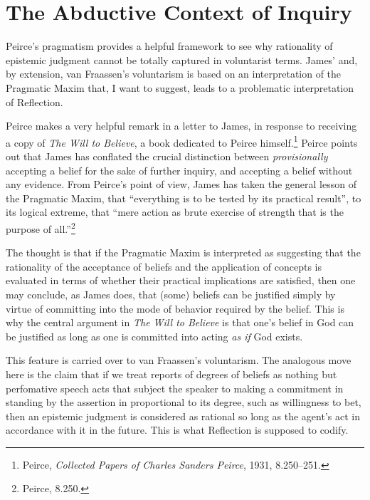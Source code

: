 \hypertarget{the-abductive-context-of-inquiry}{%
\section{The Abductive Context of
Inquiry}\label{the-abductive-context-of-inquiry}}

Peirce's pragmatism provides a helpful framework to see why rationality
of epistemic judgment cannot be totally captured in voluntarist terms.
James' and, by extension, van Fraassen's voluntarism is based on an
interpretation of the Pragmatic Maxim that, I want to suggest, leads to
a problematic interpretation of Reflection.

Peirce makes a very helpful remark in a letter to James, in response to
receiving a copy of \emph{The Will to Believe}, a book dedicated to
Peirce himself.\footnote{Peirce, \emph{Collected Papers of Charles
  Sanders Peirce}, 1931, 8.250--251.} Peirce points out that James has
conflated the crucial distinction between \emph{provisionally} accepting
a belief for the sake of further inquiry, and accepting a belief without
any evidence. From Peirce's point of view, James has taken the general
lesson of the Pragmatic Maxim, that ``everything is to be tested by its
practical result'', to its logical extreme, that ``mere action as brute
exercise of strength that is the purpose of all.''\footnote{Peirce,
  8.250.}

The thought is that if the Pragmatic Maxim is interpreted as suggesting
that the rationality of the acceptance of beliefs and the application of
concepts is evaluated in terms of whether their practical implications
are satisfied, then one may conclude, as James does, that (some) beliefs
can be justified simply by virtue of committing into the mode of
behavior required by the belief. This is why the central argument in
\emph{The Will to Believe} is that one's belief in God can be justified
as long as one is committed into acting \emph{as if} God exists.

This feature is carried over to van Fraassen's voluntarism. The
analogous move here is the claim that if we treat reports of degrees of
beliefs as nothing but perfomative speech acts that subject the speaker
to making a commitment in standing by the assertion in proportional to
its degree, such as willingness to bet, then an epistemic judgment is
considered as rational so long as the agent's act in accordance with it in
the future. This is what Reflection is supposed to codify.

